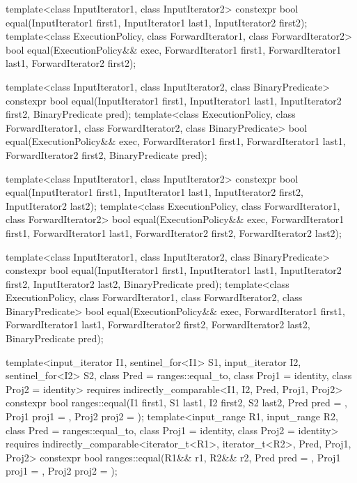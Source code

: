 %
\begin{itemdecl}
template<class InputIterator1, class InputIterator2>
  constexpr bool equal(InputIterator1 first1, InputIterator1 last1,
                       InputIterator2 first2);
template<class ExecutionPolicy, class ForwardIterator1, class ForwardIterator2>
  bool equal(ExecutionPolicy&& exec,
             ForwardIterator1 first1, ForwardIterator1 last1,
             ForwardIterator2 first2);

template<class InputIterator1, class InputIterator2,
         class BinaryPredicate>
  constexpr bool equal(InputIterator1 first1, InputIterator1 last1,
                       InputIterator2 first2, BinaryPredicate pred);
template<class ExecutionPolicy, class ForwardIterator1, class ForwardIterator2,
         class BinaryPredicate>
  bool equal(ExecutionPolicy&& exec,
             ForwardIterator1 first1, ForwardIterator1 last1,
             ForwardIterator2 first2, BinaryPredicate pred);

template<class InputIterator1, class InputIterator2>
  constexpr bool equal(InputIterator1 first1, InputIterator1 last1,
                       InputIterator2 first2, InputIterator2 last2);
template<class ExecutionPolicy, class ForwardIterator1, class ForwardIterator2>
  bool equal(ExecutionPolicy&& exec,
             ForwardIterator1 first1, ForwardIterator1 last1,
             ForwardIterator2 first2, ForwardIterator2 last2);

template<class InputIterator1, class InputIterator2,
         class BinaryPredicate>
  constexpr bool equal(InputIterator1 first1, InputIterator1 last1,
                       InputIterator2 first2, InputIterator2 last2,
                       BinaryPredicate pred);
template<class ExecutionPolicy, class ForwardIterator1, class ForwardIterator2,
         class BinaryPredicate>
  bool equal(ExecutionPolicy&& exec,
             ForwardIterator1 first1, ForwardIterator1 last1,
             ForwardIterator2 first2, ForwardIterator2 last2,
             BinaryPredicate pred);

template<input_iterator I1, sentinel_for<I1> S1, input_iterator I2, sentinel_for<I2> S2,
         class Pred = ranges::equal_to, class Proj1 = identity, class Proj2 = identity>
  requires indirectly_comparable<I1, I2, Pred, Proj1, Proj2>
  constexpr bool ranges::equal(I1 first1, S1 last1, I2 first2, S2 last2,
                               Pred pred = {},
                               Proj1 proj1 = {}, Proj2 proj2 = {});
template<input_range R1, input_range R2, class Pred = ranges::equal_to,
         class Proj1 = identity, class Proj2 = identity>
  requires indirectly_comparable<iterator_t<R1>, iterator_t<R2>, Pred, Proj1, Proj2>
  constexpr bool ranges::equal(R1&& r1, R2&& r2, Pred pred = {},
                               Proj1 proj1 = {}, Proj2 proj2 = {});
\end{itemdecl}

